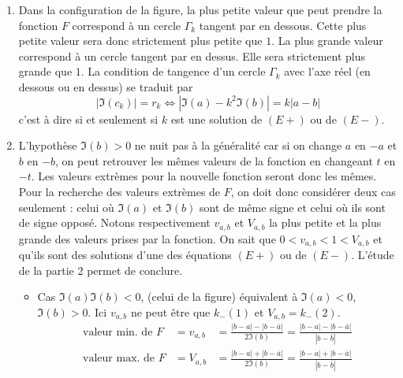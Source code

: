 \begin{enumerate}
  \item Dans la configuration de la figure, la plus petite valeur que peut prendre la fonction $F$ correspond à un cercle $\Gamma_k$ tangent \og par en dessous\fg. Cette plus petite valeur sera donc strictement plus petite que $1$. La plus grande valeur correspond à un cercle tangent \og par en dessus\fg. Elle sera strictement plus grande que $1$.\newline
  La condition de tangence d'un cercle $\Gamma_k$ avec l'axe réel (en dessous ou en dessus) se traduit par
\begin{displaymath}
  |\Im(c_k)| = r_k
  \Leftrightarrow 
  |\Im(a)-k^2\Im(b)| = k |a-b|
\end{displaymath}
c'est à dire si et seulement si $k$ est une solution de $(E+)$ ou de $(E-)$.

  \item L'hypothèse $\Im(b)>0$ ne nuit pas à la généralité car si on change $a$ en $-a$ et $b$ en $-b$, on peut retrouver les mêmes valeurs de la fonction en changeant $t$ en $-t$. Les valeurs extrèmes pour la nouvelle fonction seront donc les mêmes. Pour la recherche des valeurs extrèmes de $F$, on doit donc considérer deux cas seulement : celui où $\Im(a)$ et $\Im(b)$ sont de même signe et celui où ils sont de signe opposé.\newline
Notons respectivement $v_{a,b}$ et $V_{a,b}$ la plus petite et la plus grande des valeurs prises par la fonction. On sait que $0<v_{a,b}<1<V_{a,b}$ et qu'ils sont des solutions d'une des équations $(E+)$ ou de $(E-)$.  L'étude de la partie 2 permet de conclure.
\begin{itemize}
  \item Cas $\Im(a)\Im(b)<0$, (celui de la figure) équivalent à $\Im(a)<0$, $\Im(b)>0$.\newline
Ici $v_{a,b}$ ne peut être que $k_-(1)$ et $V_{a,b} = k_-(2)$.
\begin{align*}
  \text{valeur min. de $F$} &= v_{a,b} &= \frac{|b-a|-|b-\overline{a}|}{2\Im(b)} = \frac{|b-a|-|b-\overline{a}|}{|b-\overline{b}|} \\
  \text{valeur max. de $F$} &= V_{a,b} &= \frac{|b-a| + |b-\overline{a}|}{2\Im(b)} = \frac{|b-a|+|b-\overline{a}|}{|b-\overline{b}|} 
\end{align*}


\end{itemize}
\end{enumerate}

